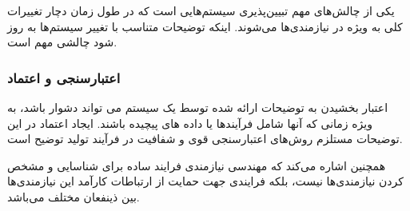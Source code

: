 یکی از چالش‌های مهم تبیین‌پذیری سیستم‌هایی است که در طول زمان دچار تغییرات کلی
به ویژه در نیازمندی‌ها می‌شوند. اینکه توضیحات متناسب با تغییر سیستم‌ها به روز
شود چالشی مهم است.

\subsubsection{اعتبارسنجی و اعتماد}

اعتبار بخشیدن به توضیحات ارائه شده توسط یک سیستم می تواند دشوار باشد، به ویژه
زمانی که آنها شامل فرآیندها یا داده های پیچیده باشند. ایجاد اعتماد در این
توضیحات مستلزم روش‌های اعتبارسنجی قوی و شفافیت در فرآیند تولید توضیح است.

همچنین اشاره می‌کند که مهندسی نیازمندی فرایند ساده برای شناسایی و مشخص کردن
نیازمندی‌ها نیست، بلکه فرایندی جهت حمایت از ارتباطات کارآمد این نیازمندی‌ها بین
ذینفعان مختلف می‌باشد.

